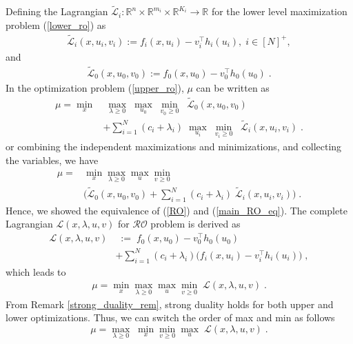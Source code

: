 \documentclass[journal,twoside,web]{ieeecolor}
\begin{document}
Defining the Lagrangian $\tilde{\mathcal{L}}_i:\mathbb{R}^n \times \mathbb{R}^{m_i} \times \mathbb{R}^{K_i} \rightarrow \mathbb{R}$ for the lower level maximization problem (\ref{lower_ro}) as
\begin{align} \label{lower_lag}
\tilde{\mathcal{L}}_i(x,u_i,v_i):=f_i(x,u_i)-v_i^\top h_{i}(u_i),\;i\in[N]^+,
\end{align}
and
\begin{align} \label{upper_lag}
\tilde{\mathcal{L}}_0(x,u_0,v_0):=f_0(x,u_0)-v_0^\top h_{0}(u_0)\;.
\end{align}
In the optimization problem (\ref{upper_ro}), $\mu$ can be written as
\begin{align} \label{main_RO_eq}
\mu=\underset{x}{\min}&\;\underset{\lambda\geq 0}{\max}\;\underset{u_0}{\max}\;\underset{v_0\geq 0}{\min}\;\; \tilde{\mathcal{L}}_0(x,u_0,v_0)\nonumber\\
&+\sum_{i=1}^N (c_i+\lambda_i)\; \underset{u_i}{\max}\;\underset{v_{i}\geq 0}{\min}\;\;\tilde{\mathcal{L}}_i(x,u_i,v_i)\;.
\end{align}
or combining the independent maximizations and minimizations, and collecting the variables, we have
\begin{align}\label{main_RO2_eq}
\mu=&\min_{x}\max_{\lambda\geq 0}\max_{u}\min_{v\geq 0} \nonumber\\
&\big(\tilde{\mathcal{L}}_0(x,u_0,v_0)+\sum_{i=1}^N (c_i+\lambda_i) \; \tilde{\mathcal{L}}_i(x,u_i,v_i)\big)\;.
\end{align}
Hence, we showed the equivalence of (\ref{RO}) and (\ref{main_RO_eq}).
The complete Lagrangian $\mathcal{L}(x,\lambda,u,v)$ for $\mathcal{RO}$ problem is derived as
\begin{align}
\mathcal{L}(x,\lambda,u,v)&\;:=\;f_0(x,u_0)-v_0^\top h_0(u_0)\nonumber\\
&+\sum_{i=1}^N (c_i+\lambda_i)\big(f_i(x,u_i)-v_i^\top h_i(u_i)\big)\;,
\label{lag}
\end{align}
which leads to
\begin{align*}
\mu=\min_{x}\max_{\lambda\geq 0}\max_{u}\min_{v\geq 0}\;\mathcal{L}(x,\lambda,u,v)\;.
\end{align*}
From Remark \ref{strong_duality_rem}, strong duality holds for both upper and lower optimizations. Thus, we can switch the order of max and min as follows
\begin{equation}\label{dual.eq}
\mu=\max_{\lambda\geq 0}\;\min_{x}\min_{v\geq 0} \max_{u}\;\mathcal{L}(x,\lambda,u,v)\;.
\end{equation}
\end{document}

